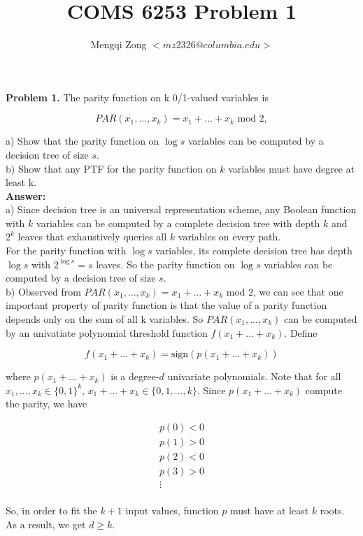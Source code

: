 \documentclass[12pt]{article}
\title{COMS 6253 Problem 1}
\author{Mengqi Zong $<mz2326@columbia.edu>$}
\newcommand{\sign}{\mathrm{sign}}
\begin{document}
\maketitle

\setlength{\parindent}{0in}

{\bf Problem 1.} The parity function on k 0/1-valued variables is

\begin{equation*}
PAR(x_1,...,x_k) = x_1 + ... + x_k \text { mod } 2,
\end{equation*}

a)  Show that the parity function on $\log s$ variables can be
computed by a decision tree of size $s$. \\

b)  Show that any PTF for the parity function on $k$ variables must
have degree at least k. \\

{\bf Answer:} \\

a) Since decision tree is an universal representation scheme, any
Boolean function with $k$ variables can be computed by a complete
decision tree with depth $k$ and $2^k$ leaves that exhaustively
queries all $k$ variables on every path. \\

For the parity function with $\log s$ variables, its complete decision
tree has depth $\log s$ with $2^{\log s} = s$ leaves. So the parity
function on $\log s$ variables can be computed by a decision tree of
size $s$. \\


b) Observed from $PAR(x_1,...,x_k) = x_1 + ... + x_k \text { mod } 2$,
we can see that one important property of parity function is that the
value of a parity function depends only on the sum of all k
variables. So $PAR(x_1,  ..., x_k)$ can be computed by an univatiate
polynomial threshold function $f(x_1 + ... + x_k)$. Define 

\begin{equation*}
f(x_1 + ... + x_k) = \sign {(p(x_1 + ... + x_k))}
\end{equation*}

where $p(x_1 + ... + x_k)$ is a degree-$d$ univariate polynomials. Note
that for all $x_1, ..., x_k \in \{0,1\}^k$, $x_1 + ... + x_k \in \{0,
1, ..., k\}$. Since $p(x_1 + ... + x_k)$ compute the parity, we have 

\begin{eqnarray*}
p(0) < 0 \\
p(1) > 0 \\
p(2) < 0 \\
p(3) > 0 \\
\vdots \\
\end{eqnarray*}

So, in order to fit the $k+1$ input values, function $p$ must have at
least $k$ roots. As a result, we get $d \ge k$.
\end{document}
